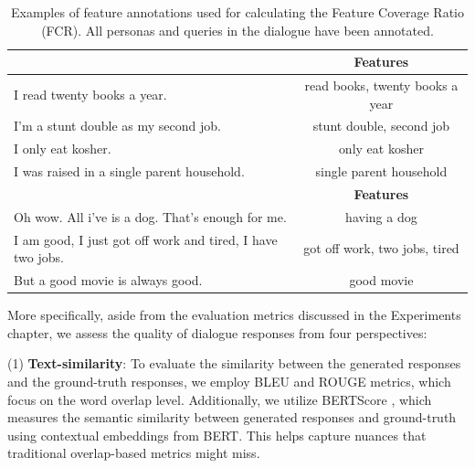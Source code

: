 \documentclass[letterpaper]{article} %
\begin{document}
\begin{table}[ht]
\centering
\def\arraystretch{1.2}%
\begin{tabular}{|l|c|}
\hline

\rowcolor[RGB]{204,217,245}
\multicolumn{1}{|c|}{\textbf{Persona description}} & \textbf{Features} \\
\hline

I read twenty books a year. & read books, twenty books a year   \\
\hline

I'm a stunt double as my second job. & stunt double, second job \\
\hline

I only eat kosher. & only eat kosher \\
\hline

I was raised in a single parent household. & single parent household \\
\hline

\rowcolor[RGB]{204,217,245}
\multicolumn{1}{|c|}{\textbf{Utterance}} & \textbf{Features} \\
\hline

Oh wow. All i've is a dog. That's enough for me. & having a dog  \\
\hline

I am good, I just got off work and tired, I have two jobs. & got off work, two jobs, tired \\
\hline

But a good movie is always good. & good movie \\
\hline

\end{tabular}
\caption{Examples of feature annotations used for calculating the Feature Coverage Ratio (FCR). All personas and queries in the dialogue have been annotated.}
\label{table:fcr-feature-annotated-example}
\end{table}

More specifically, aside from the evaluation metrics discussed in the Experiments chapter, we assess the quality of dialogue responses from four perspectives: 

(1) \textbf{Text-similarity}: To evaluate the similarity between the generated responses and the ground-truth responses, we employ BLEU \cite{papineni-etal-2002-bleu} and ROUGE \cite{lin-2004-rouge} metrics, which focus on the word overlap level. Additionally, we utilize BERTScore \cite{zhang-etal-2020-bert-score}, which measures the semantic similarity between generated responses and ground-truth using contextual embeddings from BERT. This helps capture nuances that traditional overlap-based metrics might miss.
\end{document}
